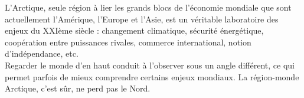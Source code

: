\documentclass[8pt]{article}
\begin{document}
L’Arctique, seule région à lier les grands blocs de l’économie mondiale que sont actuellement l’Amérique, l’Europe et l’Asie, est un véritable laboratoire des enjeux du XXIème siècle : changement climatique, sécurité énergétique, coopération entre puissances rivales, commerce international, notion d’indépendance, etc.\\

Regarder le monde d’en haut conduit à l’observer sous un angle différent, ce qui permet parfois de mieux comprendre certains enjeux mondiaux. La région-monde Arctique, c’est sûr, ne perd pas le Nord.
\end{document}

